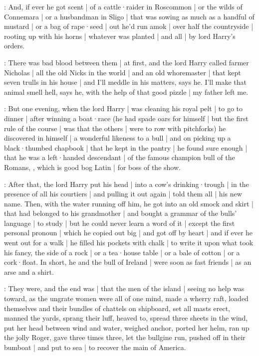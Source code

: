 \dixon:
And,
if ever he got scent |
of a cattle·raider in Roscommon |
or the wilds of Connemara |
or a husbandman in Sligo |
that was sowing as much as a handful of mustard |
or a bag of rape·seed |
out he'd run amok |
over half the countryside |
rooting up with his horns |
whatever was planted |
and all |
by lord Harry's orders.

\lynch:
There was bad blood between them |
at first,
and the lord Harry called farmer Nicholas |
all the old Nicks in the world |
and an old whoremaster |
that kept seven trulls in his house |
and I'll meddle in his matters,
says he.
I'll make that animal smell hell,
says he,
with the help of that good pizzle |
my father left me.

\dixon:
But one evening,
when the lord Harry |
was cleaning his royal pelt |
to go to dinner |
after winning a boat·race
(he had spade oars for himself |
but the first rule of the course |
was that the others |
were to row with pitchforks)
he discovered in himself |
a wonderful likeness to a bull |
and on picking up a black·thumbed chapbook |
that he kept in the pantry |
he found sure enough |
that he was a left·handed descendant |
of the famous champion bull of the Romans,
,
which is good bog Latin |
for boss of the show.

\lynch:
After that,
the lord Harry put his head |
into a cow's drinking·trough |
in the presence of all his courtiers |
and pulling it out again |
told them all |
his new name.
Then,
with the water running off him,
he got into an old smock and skirt |
that had belonged to his grandmother |
and bought a grammar of the bulls' language |
to study |
but he could never learn a word of it |
except the first personal pronoun |
which he copied out big |
and got off by heart |
and if ever he went out for a walk |
he filled his pockets with chalk |
to write it upon what took his fancy,
the side of a rock |
or a tea·house table |
or a bale of cotton |
or a cork·float.
In short,
he and the bull of Ireland |
were soon as fast friends |
as an arse and a shirt.

\stephen:
They were,
and the end was |
that the men of the island |
seeing no help was toward,
as the ungrate women were all of one mind,
made a wherry raft,
loaded themselves and their bundles of chattels on shipboard,
set all masts erect,
manned the yards,
sprang their luff,
heaved to,
spread three sheets in the wind,
put her head between wind and water,
weighed anchor,
ported her helm,
ran up the jolly Roger,
gave three times three,
let the bullgine run,
pushed off in their bumboat |
and put to sea |
to recover the main of America.

